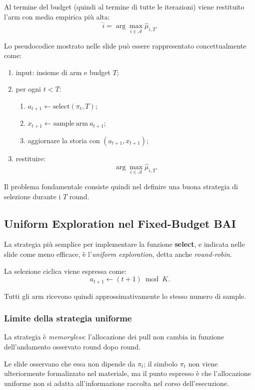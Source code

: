 Al termine del budget (quindi al termine di tutte le iterazioni) viene restituito l'arm con media empirica più alta:
\[
\widehat{i}
=
\arg\max_{i\in\mathcal{A}}
\widehat{\mu}_{i,T}.
\]

Lo pseudocodice mostrato nelle slide può essere rappresentato concettualmente come:
\begin{enumerate}
    \item input: insieme di arm e budget $T$;
    \item per ogni $t<T$:
    \begin{enumerate}
        \item $a_{t+1}\leftarrow \mathrm{select}(\pi_t,T)$;
        \item $x_{t+1}\leftarrow\mathrm{sample\ arm}\ a_{t+1}$;
        \item aggiornare la storia con $(a_{t+1},x_{t+1})$;
    \end{enumerate}
    \item restituire:
    \[
    \arg\max_{i\in\mathcal{A}}\widehat{\mu}_{i,T}.
    \]
\end{enumerate}

Il problema fondamentale consiste quindi nel definire una buona strategia di selezione durante i $T$ round.

\subsection{Uniform Exploration nel Fixed-Budget BAI}

La strategia più semplice per implementare la funzione \textbf{select}, e indicata nelle slide come meno efficace, è l'\emph{uniform exploration}, detta anche \emph{round-robin}.

La selezione ciclica viene espressa come:
\[
a_{t+1}
\leftarrow
(t+1)\bmod K.
\]

Tutti gli arm ricevono quindi approssimativamente lo stesso numero di sample.

\subsubsection{Limite della strategia uniforme}

La strategia è \emph{memoryless}: l'allocazione dei pull non cambia in funzione dell'andamento osservato round dopo round.

Le slide osservano che essa non dipende da $\pi_t$; il simbolo $\pi_t$ non viene ulteriormente formalizzato nel materiale, ma il punto espresso è che l'allocazione uniforme non si adatta all'informazione raccolta nel corso dell'esecuzione.

